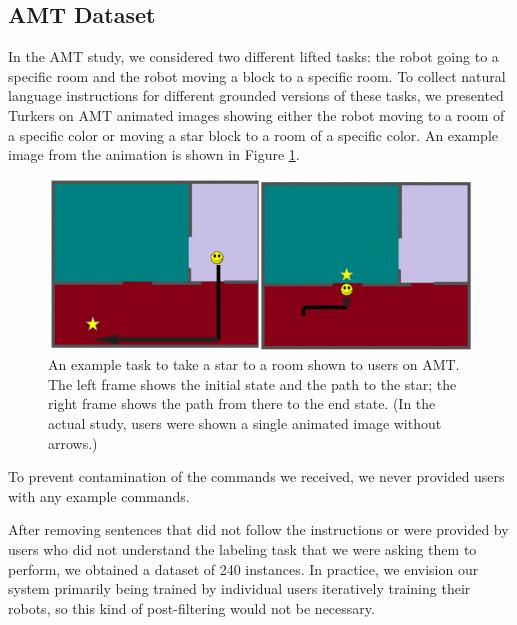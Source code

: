 \documentclass[conference]{IEEEtran}
\begin{document}
\subsection{AMT Dataset}
In the AMT study, we considered two different lifted tasks: the robot going to a specific room and the robot moving a block to a specific room. To collect natural language instructions for different grounded versions of these tasks, we presented Turkers on AMT animated images showing either the robot moving to a room of a specific color or moving a star block to a room of a specific color. An example image from the animation is shown in Figure \ref{fig:animation}.
\begin{figure}[tp]
\begin{center}
\includegraphics[width=\columnwidth]{images/map1_2a}
\caption{\small An example task to take a star to a room shown to users on AMT. The left frame shows the initial state and the path to the star; the right frame shows the path from there to the end state. (In the actual study, users were shown a single animated image without arrows.)}
\label{fig:animation}
\end{center}
\end{figure}
To prevent contamination of the commands we received, we never provided users with any example commands. 

After removing sentences that did not follow the instructions or were provided by users who did not understand the labeling task that we were asking them to perform, we obtained a dataset of 240 instances. %
In practice, we envision our system primarily being trained by individual users iteratively training their robots, so this kind of post-filtering would not be necessary.
\end{document}
